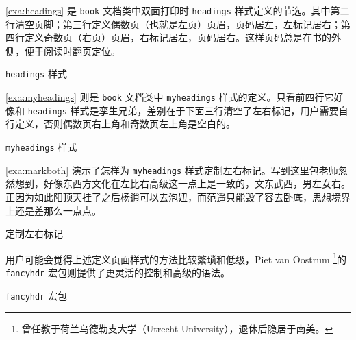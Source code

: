 \autoref{exa:headings} 是 \texttt{book} 文档类中双面打印时 \texttt{headings} 样式定义的节选。其中第二行清空页脚；第三行定义偶数页（也就是左页）页眉，页码居左，左标记居右；第四行定义奇数页（右页）页眉，右标记居左，页码居右。这样页码总是在书的外侧，便于阅读时翻页定位。 

\begin{example}[htbp]
\begin{Code}[]
\def\ps@headings{%
  \let\@oddfoot\@empty\let\@evenfoot\@empty
  \def\@evenhead{\thepage\hfil\slshape\leftmark}%
  \def\@oddhead{{\slshape\rightmark}\hfil\thepage}%
  ...
\end{Code}
\caption{\texttt{headings} 样式}
\label{exa:headings}
\end{example}

\autoref{exa:myheadings} 则是 \texttt{book} 文档类中 \texttt{myheadings} 样式的定义。只看前四行它好像和 \texttt{headings} 样式是孪生兄弟，差别在于下面三行清空了左右标记，用户需要自行定义，否则偶数页右上角和奇数页左上角是空白的。

\begin{example}[htbp]
\begin{Code}[]
\def\ps@myheadings{%
  \let\@oddfoot\@empty\let\@evenfoot\@empty
  \def\@evenhead{\thepage\hfil\slshape\leftmark}%
  \def\@oddhead{{\slshape\rightmark}\hfil\thepage}%
  \let\@mkboth\@gobbletwo
  \let\chaptermark\@gobble
  \let\sectionmark\@gobble
}
\end{Code}
\caption{\texttt{myheadings} 样式}
\label{exa:myheadings}
\end{example}

\autoref{exa:markboth} 演示了怎样为 \texttt{myheadings} 样式定制左右标记。写到这里包老师忽然想到，好像东西方文化在左比右高级这一点上是一致的，文东武西，男左女右。正因为如此阳顶天挂了之后杨逍可以去泡妞，而范遥只能毁了容去卧底，思想境界上还是差那么一点点。

\begin{example}[htbp]
\caption{定制左右标记}
\label{exa:markboth}
\end{example}

用户可能会觉得上述定义页面样式的方法比较繁琐和低级，Piet van Oostrum\indexOostrum{} \footnote{曾任教于荷兰乌德勒支大学（Utrecht University），退休后隐居于南美。}的 \texttt{fancyhdr} 宏包\citep{Oostrum_fancyhdr}则提供了更灵活的控制和高级的语法。

\begin{example}[htbp]
\caption{\texttt{fancyhdr} 宏包}
\label{exa:fancyhdr}
\end{example}


